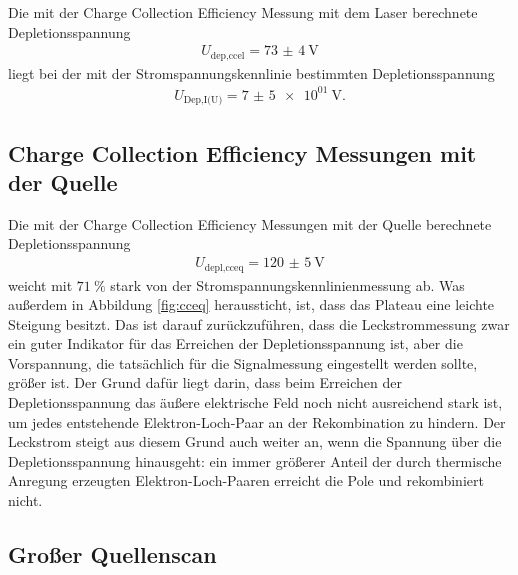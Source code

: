 Die mit der Charge Collection Efficiency Messung mit dem Laser berechnete Depletionsspannung
\begin{align}
  U_\text{dep,ccel} = \SI{73(4)}{\volt}
\end{align}
liegt bei der mit der Stromspannungskennlinie bestimmten Depletionsspannung
\begin{align}
  U_\text{Dep,I(U)} = \SI{7(5)e01}{\volt}.
\end{align}

\subsection{Charge Collection Efficiency Messungen mit der Quelle}

Die mit der Charge Collection Efficiency Messungen mit der Quelle berechnete Depletionsspannung
\begin{align}
  U_\text{depl,cceq} = \SI{120(5)}{\volt}
\end{align}
weicht mit $\SI{71}{\percent}$ stark von der Stromspannungskennlinienmessung ab. Was außerdem in Abbildung
\ref{fig:cceq} heraussticht, ist, dass das Plateau eine leichte Steigung besitzt.
Das ist darauf zurückzuführen, dass die Leckstrommessung zwar ein guter Indikator für das Erreichen der
Depletionsspannung ist, aber die Vorspannung, die tatsächlich für die Signalmessung eingestellt werden sollte,
größer ist. Der Grund dafür liegt darin, dass beim Erreichen der Depletionsspannung das äußere elektrische Feld noch nicht
ausreichend stark ist, um jedes entstehende Elektron-Loch-Paar an der Rekombination zu hindern. Der Leckstrom steigt aus diesem
Grund auch weiter an, wenn die Spannung über die Depletionsspannung hinausgeht: ein immer größerer Anteil der durch
thermische Anregung erzeugten Elektron-Loch-Paaren erreicht die Pole und rekombiniert nicht.

\subsection{Großer Quellenscan}


